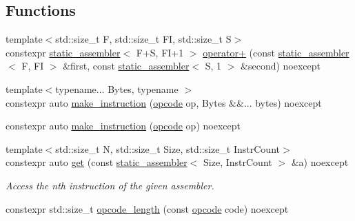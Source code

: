\subsection*{Functions}
\begin{DoxyCompactItemize}
\item 
{\footnotesize template$<$std\+::size\+\_\+t F, std\+::size\+\_\+t FI, std\+::size\+\_\+t S$>$ }\\constexpr \mbox{\hyperlink{classdistant_1_1assembly_1_1static__assembler}{static\+\_\+assembler}}$<$ F+S, FI+1 $>$ \mbox{\hyperlink{namespacedistant_1_1assembly_a1fc4551ec9708ff19592019305e09983}{operator+}} (const \mbox{\hyperlink{classdistant_1_1assembly_1_1static__assembler}{static\+\_\+assembler}}$<$ F, FI $>$ \&first, const \mbox{\hyperlink{classdistant_1_1assembly_1_1static__assembler}{static\+\_\+assembler}}$<$ S, 1 $>$ \&second) noexcept
\item 
{\footnotesize template$<$typename... Bytes, typename $>$ }\\constexpr auto \mbox{\hyperlink{namespacedistant_1_1assembly_a1e6310ecc2d9bbb403adb7bd8b933c09}{make\+\_\+instruction}} (\mbox{\hyperlink{namespacedistant_1_1assembly_a64d7b047d9e3df1ac04919f7c4f8f6fa}{opcode}} op, Bytes \&\&... bytes) noexcept
\item 
constexpr auto \mbox{\hyperlink{namespacedistant_1_1assembly_a9c99faffef3ae358ebb79a499415f770}{make\+\_\+instruction}} (\mbox{\hyperlink{namespacedistant_1_1assembly_a64d7b047d9e3df1ac04919f7c4f8f6fa}{opcode}} op) noexcept
\item 
{\footnotesize template$<$std\+::size\+\_\+t N, std\+::size\+\_\+t Size, std\+::size\+\_\+t Instr\+Count$>$ }\\constexpr auto \mbox{\hyperlink{namespacedistant_1_1assembly_ab015590dc9e6ba7cb1e14307dff5b11a}{get}} (const \mbox{\hyperlink{classdistant_1_1assembly_1_1static__assembler}{static\+\_\+assembler}}$<$ Size, Instr\+Count $>$ \&a) noexcept
\begin{DoxyCompactList}\small\item\em Access the nth instruction of the given assembler. \end{DoxyCompactList}\item 
constexpr std\+::size\+\_\+t \mbox{\hyperlink{namespacedistant_1_1assembly_a909ebf61cf8020faecaabd9b873f7da4}{opcode\+\_\+length}} (const \mbox{\hyperlink{namespacedistant_1_1assembly_a64d7b047d9e3df1ac04919f7c4f8f6fa}{opcode}} code) noexcept
\end{DoxyCompactItemize}


